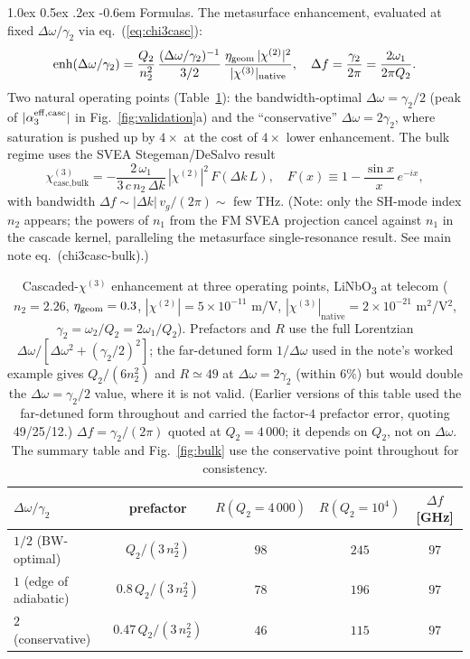 \documentclass[11pt,a4paper]{article}
\makeatletter
\newcommand{\chitwo}{\chi^{(2)}}
\newcommand{\chithree}{\chi^{(3)}}
\newcommand{\Dom}{\Delta\omega}
\newcommand{\effc}{{\rm eff,casc}}
\newcommand{\geom}{{\rm geom}}
\renewcommand\paragraph{%
  \@startsection{paragraph}{4}{\z@}%
                {1.0ex \@plus 0.5ex \@minus .2ex}%
                {-0.6em}%
                {\normalfont\itshape}}
\makeatother
\begin{document}
\paragraph{Formulas.}
The metasurface enhancement, evaluated at fixed
$\Dom/\gamma_2$ via eq.~(\ref{eq:chi3casc}):
\begin{equation}
  \text{enh}(\Dom/\gamma_2)
   = \frac{Q_2}{n_2^{2}}\,
     \frac{(\Dom/\gamma_2)^{-1}}{3/2}\,
     \frac{\eta_\geom\, |\chitwo|^{2}}{|\chithree|_{\rm native}},
   \quad
   \Delta f = \frac{\gamma_2}{2\pi} = \frac{2\omega_1}{2\pi Q_2}.
\end{equation}
Two natural operating points (Table~\ref{tab:opppoint}): the
bandwidth-optimal $\Dom = \gamma_2/2$ (peak of
$|\alpha_3^{\effc}|$ in Fig.~\ref{fig:validation}a) and the
``conservative'' $\Dom = 2\gamma_2$, where saturation is pushed up by
$4\times$ at the cost of $4\times$ lower enhancement.
The bulk regime uses the SVEA Stegeman/DeSalvo result
\begin{equation}
  \chithree_{\text{casc,bulk}}
   = -\frac{2\,\omega_1}{3\,c\,n_2\,\Delta k}\,
       |\chitwo|^{2}\, F(\Delta k\,L),
   \quad
   F(x) \equiv 1 - \frac{\sin x}{x}\,e^{-ix},
\end{equation}
with bandwidth $\Delta f \sim |\Delta k|\, v_g / (2\pi) \sim$ few THz.
(Note: only the SH-mode index $n_2$ appears; the powers of $n_1$ from the
FM SVEA projection cancel against $n_1$ in the cascade kernel, paralleling
the metasurface single-resonance result.  See main note eq.~(chi3casc-bulk).)

\begin{table}[H]
\centering
\renewcommand{\arraystretch}{1.20}
\small
\begin{tabular}{lcccc}
\toprule
$\Dom/\gamma_2$ & prefactor & $R(Q_2{=}4\,000)$ & $R(Q_2{=}10^{4})$ & $\Delta f$ [GHz] \\
\midrule
$1/2$ (BW-optimal)      & $Q_2/(3\, n_2^{2})$        & $98$ & $245$ & $97$ \\
$1$ (edge of adiabatic) & $0.8\,Q_2/(3\, n_2^{2})$   & $78$ & $196$ & $97$ \\
$2$ (conservative)      & $0.47\,Q_2/(3\, n_2^{2})$  & $46$ & $115$ & $97$ \\
\bottomrule
\end{tabular}
\caption{Cascaded-$\chithree$ enhancement at three operating points,
LiNbO\textsubscript{3} at telecom ($n_2 = 2.26$, $\eta_\geom = 0.3$,
$|\chitwo| = 5\!\times\!10^{-11}$ m/V,
$|\chithree|_\text{native} = 2\!\times\!10^{-21}$ m$^{2}$/V$^{2}$,
$\gamma_2 = \omega_2/Q_2 = 2\omega_1/Q_2$).  Prefactors and $R$ use the
full Lorentzian $\Dom/[\Dom^2+(\gamma_2/2)^2]$; the far-detuned form
$1/\Dom$ used in the note's worked example gives $Q_2/(6n_2^2)$ and
$R\simeq49$ at $\Dom=2\gamma_2$ (within $6\%$) but would double the
$\Dom=\gamma_2/2$ value, where it is not valid.  (Earlier versions of
this table used the far-detuned form throughout and carried the
factor-$4$ prefactor error, quoting 49/25/12.)  $\Delta f = \gamma_2/(2\pi)$
quoted at $Q_2 = 4\,000$; it depends on $Q_2$, not on $\Dom$. The
summary table and Fig.~\ref{fig:bulk} use the conservative point
throughout for consistency.}
\label{tab:opppoint}
\end{table}
\end{document}

